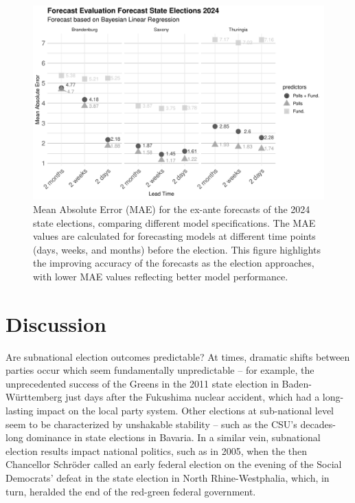\documentclass[12pt]{article}
\begin{document}
\begin{doublespacing}
\begin{figure}
    \centering
    \includegraphics[width=\textwidth]{fg6_forecast_evaluation_mae.pdf}
    \caption{Mean Absolute Error (MAE) for the ex-ante forecasts of the 2024 state elections, comparing different model specifications. The MAE values are calculated for forecasting models at different time points (days, weeks, and months) before the election. This figure highlights the improving accuracy of the forecasts as the election approaches, with lower MAE values reflecting better model performance.}
    \label{fig:forecast-evaluation-mae}
\end{figure}

\FloatBarrier
\section{Discussion}

Are subnational election outcomes predictable? At times, dramatic shifts between parties occur which seem fundamentally unpredictable -- for example, the unprecedented success of the Greens in the 2011 state election in Baden-Württemberg just days after the Fukushima nuclear accident, which had a long-lasting impact on the local party system. Other elections at sub-national level seem to be characterized by unshakable stability -- such as the CSU's decades-long dominance in state elections in Bavaria. In a similar vein, subnational election results impact national politics, such as in 2005, when the then Chancellor Schröder called an early federal election on the evening of the Social Democrats' defeat in the state election in North Rhine-Westphalia, which, in turn, heralded the end of the red-green federal government. 


\end{doublespacing}
\end{document}

